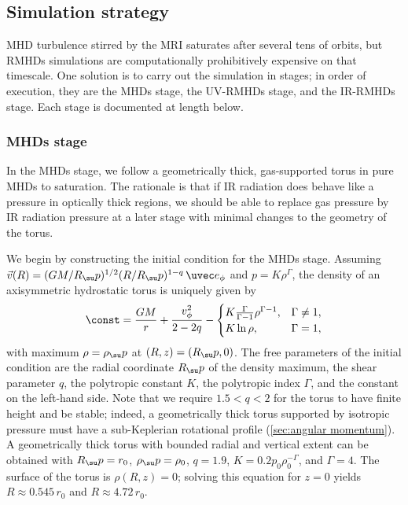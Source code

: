 \documentclass[twocolumn]{article}
\newcommand*\uvrmhd{\ac{UV}\protect\nobreakdash-\acp{RMHD}}
\newcommand*\irrmhd{\ac{IR}\protect\nobreakdash-\acp{RMHD}}
\begin{document}
\subsection{Simulation strategy}
\label{sec:strategy}

\Ac{MHD} turbulence stirred by the \ac{MRI} saturates after several tens of
orbits, but \acp{RMHD} simulations are computationally prohibitively expensive
on that timescale. One solution is to carry out the simulation in stages; in
order of execution, they are the \acp{MHD} stage, the \uvrmhd{} stage, and the
\irrmhd{} stage. Each stage is documented at length below.

\subsubsection{\texorpdfstring{\acsp*{MHD}}{MHD} stage}
\label{sec:MHD stage}

In the \acp{MHD} stage, we follow a geometrically thick, gas-supported torus in
pure \acp{MHD} to saturation. The rationale is that if \ac{IR} radiation does
behave like a pressure in optically thick regions, we should be able to replace
gas pressure by \ac{IR} radiation pressure at a later stage with minimal
changes to the geometry of the torus.

We begin by constructing the initial condition for the \acp{MHD} stage.
Assuming $\vec v(R)=(GM/R_\su p)^{1/2}(R/R_\su p)^{1-q}\,\uvec e_\phi$ and
$p=K\rho^\Gamma$, the density of an axisymmetric hydrostatic torus is uniquely
given by \citep{1984MNRAS.208..721P}
\begin{equation}
\const=\frac{GM}r+\frac{v_\phi^2}{2-2q}
-\begin{cases}
  K\tfrac\Gamma{\Gamma-1}\rho^{\Gamma-1}, & \Gamma\ne1, \\
  K\ln\rho, & \Gamma=1,
\end{cases}
\end{equation}
with maximum $\rho=\rho_\su p$ at $(R,z)=(R_\su p,0)$. The free parameters of
the initial condition are the radial coordinate $R_\su p$ of the density
maximum, the shear parameter $q$, the polytropic constant $K$, the polytropic
index $\Gamma$, and the constant on the left-hand side. Note that we require
$1.5<q<2$ for the torus to have finite height and be stable; indeed, a
geometrically thick torus supported by isotropic pressure must have a
sub-Keplerian rotational profile (\cref{sec:angular momentum}). A geometrically
thick torus with bounded radial and vertical extent can be obtained with $R_\su
p=r_0$, $\rho_\su p=\rho_0$, $q=1.9$, $K=0.2p_0\rho_0^{-\Gamma}$, and
$\Gamma=4$. The surface of the torus is $\rho(R,z)=0$; solving this equation
for $z=0$ yields $R\approx0.545\,r_0$ and $R\approx4.72\,r_0$.
\end{document}
